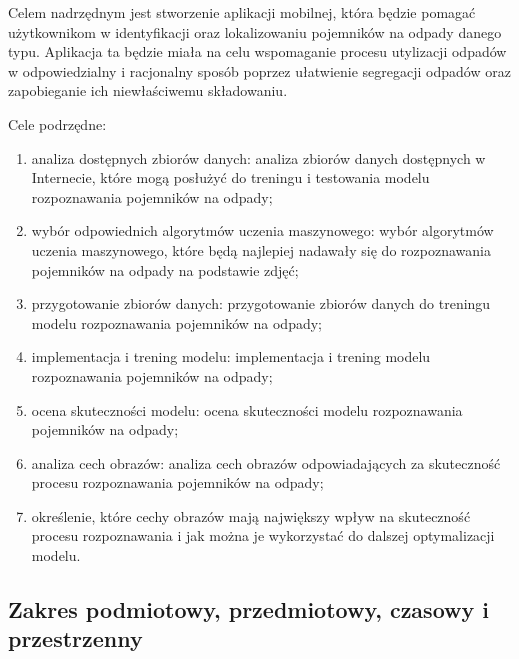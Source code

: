 \documentclass[12pt,twoside]{book}
\begin{document}
Celem nadrzędnym jest stworzenie aplikacji mobilnej, która będzie pomagać użytkownikom w identyfikacji oraz lokalizowaniu pojemników na odpady danego typu. Aplikacja ta będzie miała na celu wspomaganie procesu utylizacji odpadów w odpowiedzialny i racjonalny sposób poprzez ułatwienie segregacji odpadów oraz zapobieganie ich niewłaściwemu składowaniu.

Cele podrzędne:

\begin{enumerate}[label=--]
    \item analiza dostępnych zbiorów danych: analiza zbiorów danych dostępnych w Internecie, które mogą posłużyć do treningu i testowania modelu rozpoznawania pojemników na odpady;
    \item wybór odpowiednich algorytmów uczenia maszynowego: wybór algorytmów uczenia maszynowego, które będą najlepiej nadawały się do rozpoznawania pojemników na odpady na podstawie zdjęć;
    \item przygotowanie zbiorów danych: przygotowanie zbiorów danych do treningu modelu rozpoznawania pojemników na odpady;
    \item implementacja i trening modelu: implementacja i trening modelu rozpoznawania pojemników na odpady;
    \item ocena skuteczności modelu: ocena skuteczności modelu rozpoznawania pojemników na odpady;
    \item analiza cech obrazów: analiza cech obrazów odpowiadających za skuteczność procesu rozpoznawania pojemników na odpady;
    \item określenie, które cechy obrazów mają największy wpływ na skuteczność procesu rozpoznawania i jak można je wykorzystać do dalszej optymalizacji modelu.
\end{enumerate}


\subsection{Zakres podmiotowy, przedmiotowy, czasowy i przestrzenny}
\end{document}
